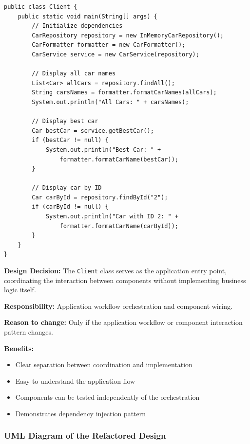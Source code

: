 \begin{verbatim}
public class Client {
    public static void main(String[] args) {
        // Initialize dependencies
        CarRepository repository = new InMemoryCarRepository();
        CarFormatter formatter = new CarFormatter();
        CarService service = new CarService(repository);
        
        // Display all car names
        List<Car> allCars = repository.findAll();
        String carsNames = formatter.formatCarNames(allCars);
        System.out.println("All Cars: " + carsNames);
        
        // Display best car
        Car bestCar = service.getBestCar();
        if (bestCar != null) {
            System.out.println("Best Car: " + 
                formatter.formatCarName(bestCar));
        }
        
        // Display car by ID
        Car carById = repository.findById("2");
        if (carById != null) {
            System.out.println("Car with ID 2: " + 
                formatter.formatCarName(carById));
        }
    }
}
\end{verbatim}

\textbf{Design Decision:} The \texttt{Client} class serves as the application entry point, coordinating the interaction between components without implementing business logic itself.

\textbf{Responsibility:} Application workflow orchestration and component wiring.

\textbf{Reason to change:} Only if the application workflow or component interaction pattern changes.

\textbf{Benefits:}
\begin{itemize}
    \item Clear separation between coordination and implementation
    \item Easy to understand the application flow
    \item Components can be tested independently of the orchestration
    \item Demonstrates dependency injection pattern
\end{itemize}

\subsubsection{UML Diagram of the Refactored Design}

